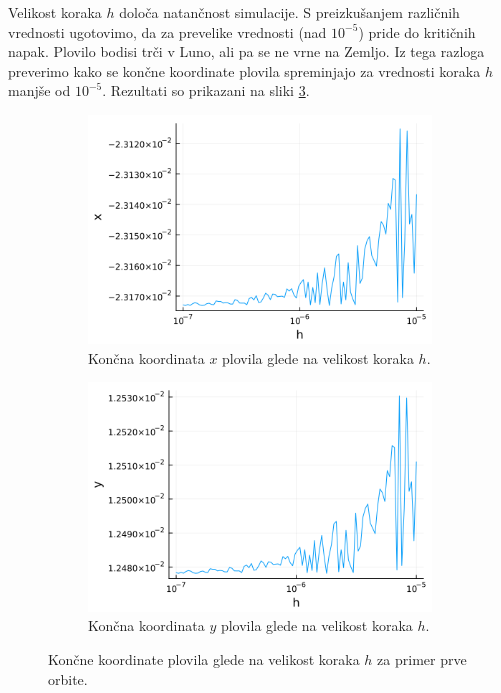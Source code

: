 \documentclass[11pt, titlepage]{article}
\begin{document}
Velikost koraka $h$ določa natančnost simulacije. S preizkušanjem različnih vrednosti ugotovimo, da za prevelike vrednosti (nad $10^{-5}$) pride do kritičnih napak. Plovilo bodisi trči v Luno, ali pa se ne vrne na Zemljo.
Iz tega razloga preverimo kako se končne koordinate plovila spreminjajo za vrednosti koraka $h$ manjše od $10^{-5}$. Rezultati so prikazani na sliki \ref{fig:step_size}.
\begin{figure}[h]
    \centering
        \begin{subfigure}[b]{0.45\textwidth}
        \centering
        \includegraphics[width=\textwidth]{figures/x_coordinate_vs_dt.png}
        \caption{Končna koordinata $x$ plovila glede na velikost koraka $h$.}
        \label{fig:x_coordinate_vs_dt}
    \end{subfigure}
    \hfill
    \begin{subfigure}[b]{0.45\textwidth}
        \centering
        \includegraphics[width=\textwidth]{figures/y_coordinate_vs_dt.png}
        \caption{Končna koordinata $y$ plovila glede na velikost koraka $h$.}
        \label{fig:y_coordinate_vs_dt}
    \end{subfigure}

    \caption{Končne koordinate plovila glede na velikost koraka $h$ za primer prve orbite.}
    \label{fig:step_size}
\end{figure}
\end{document}
